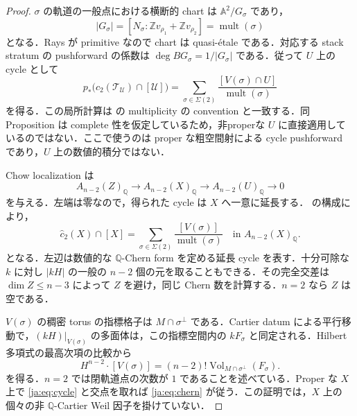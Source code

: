 \documentclass[12pt]{amsart}
\theoremstyle{definition}
\theoremstyle{remark}
\numberwithin{equation}{section}
\theoremstyle{plain}
\theoremstyle{definition}
\theoremstyle{remark}
\begin{document}
\begin{proof}
$\sigma$ の軌道の一般点における横断的 chart は $\mathbb A^2/G_\sigma$ であり，
\[
|G_\sigma|=[N_\sigma:\mathbb Zv_{\rho_1}+\mathbb Zv_{\rho_2}]
=\operatorname{mult}(\sigma)
\]
となる．Rays が primitive なので chart は quasi-\'{e}tale である．対応する stack stratum の pushforward の係数は $\deg BG_\sigma=1/|G_\sigma|$ である．従って $U$ 上の cycle として
\[
p_*\bigl(c_2(\mathcal T_{\mathcal U})\cap[\mathcal U]\bigr)
=\sum_{\sigma\in\Sigma(2)}
\frac{[V(\sigma)\cap U]}{\operatorname{mult}(\sigma)}
\]
を得る．この局所計算は \cite[Definition~3.1 and Proposition~3.2]{ja:EM} の multiplicity の convention と一致する．同 Proposition は complete 性を仮定しているため，非properな $U$ に直接適用しているのではない．ここで使うのは proper な粗空間射による cycle pushforward であり，$U$ 上の数値的積分ではない．

Chow localization は
\[
A_{n-2}(Z)_{\mathbb Q}\longrightarrow
A_{n-2}(X)_{\mathbb Q}\longrightarrow
A_{n-2}(U)_{\mathbb Q}\longrightarrow0
\]
を与える．左端は零なので，得られた cycle は $X$ へ一意に延長する．\cite[\S3.10]{ja:GKPT} の構成により，
\begin{equation}\label{ja:eq:cycle}
 \widehat c_2(X)\cap[X]
 =\sum_{\sigma\in\Sigma(2)}
     \frac{[V(\sigma)]}{\operatorname{mult}(\sigma)}
 \quad\text{in }A_{n-2}(X)_{\mathbb Q}.
\end{equation}
となる．左辺は数値的な $\mathbb Q$-Chern form を定める延長 cycle を表す．十分可除な $k$ に対し $|kH|$ の一般の $n-2$ 個の元を取ることもできる．その完全交差は $\dim Z\le n-3$ によって $Z$ を避け，同じ Chern 数を計算する．$n=2$ なら $Z$ は空である．

$V(\sigma)$ の稠密 torus の指標格子は $M\cap\sigma^\perp$ である．Cartier datum による平行移動で，$(kH)|_{V(\sigma)}$ の多面体は，この指標空間内の $kF_\sigma$ と同定される．Hilbert 多項式の最高次項の比較から
\begin{equation}\label{ja:eq:orbit-degree}
 H^{n-2}\cdot[V(\sigma)]
 =(n-2)!\operatorname{Vol}_{M\cap\sigma^\perp}(F_\sigma).
\end{equation}
を得る．$n=2$ では閉軌道点の次数が $1$ であることを述べている．Proper な $X$ 上で \eqref{ja:eq:cycle} と交点を取れば \eqref{ja:eq:chern} が従う．この証明では，$X$ 上の個々の非 $\mathbb Q$-Cartier Weil 因子を掛けていない．
\end{proof}
\end{document}
